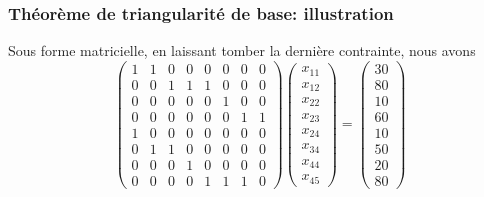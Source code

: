 \documentclass[usepdftitle=false]{beamer}
\begin{document}
\begin{frame}
\frametitle{Théorème de triangularité de base: illustration}

Sous forme matricielle, en laissant tomber la dernière contrainte, nous avons
\[
\begin{pmatrix}
 1 & 1 & 0 & 0 & 0 & 0 & 0 & 0 \\
 0 & 0 & 1 & 1 & 1 & 0 & 0 & 0 \\
 0 & 0 & 0 & 0 & 0 & 1 & 0 & 0 \\
 0 & 0 & 0 & 0 & 0 & 0 & 1 & 1 \\
 1 & 0 & 0 & 0 & 0 & 0 & 0 & 0 \\
 0 & 1 & 1 & 0 & 0 & 0 & 0 & 0 \\
 0 & 0 & 0 & 1 & 0 & 0 & 0 & 0 \\
 0 & 0 & 0 & 0 & 1 & 1 & 1 & 0
\end{pmatrix}
\begin{pmatrix}
x_{11} \\
x_{12} \\
x_{22} \\
x_{23} \\
x_{24} \\
x_{34} \\
x_{44} \\
x_{45}
\end{pmatrix}
=
\begin{pmatrix}
30 \\
80 \\
10 \\
60 \\
10 \\
50 \\
20 \\
80
\end{pmatrix}
\]

\end{frame}
\end{document}
